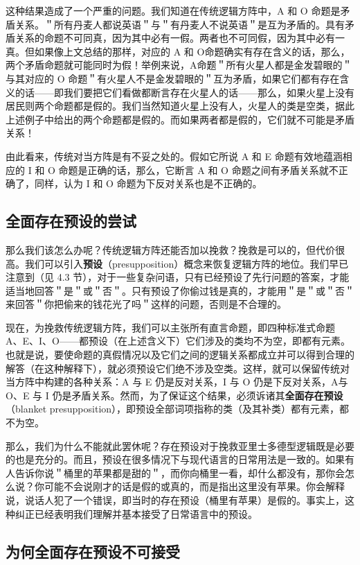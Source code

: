 这种结果造成了一个严重的问题。我们知道在传统逻辑方阵中，A 和 O 命题是矛盾关系。＂所有丹麦人都说英语＂与＂有丹麦人不说英语＂是互为矛盾的。具有矛盾关系的命题不可同真，因为其中必有一假。两者也不可同假，因为其中必有一真。但如果像上文总结的那样，对应的 A 和 O命题确实有存在含义的话，那么，两个矛盾命题就可能同时为假！举例来说，A命题＂所有火星人都是金发碧眼的＂与其对应的 O 命题＂有火星人不是金发碧眼的＂互为矛盾，如果它们都有存在含义的话——即我们要把它们看做都断言存在火星人的话——那么，如果火星上没有居民则两个命题都是假的。我们当然知道火星上没有人，火星人的类是空类，据此上述例子中给出的两个命题都是假的。而如果两者都是假的，它们就不可能是矛盾关系！

由此看来，传统对当方阵是有不妥之处的。假如它所说 A 和 E 命题有效地蕴涵相应的 I 和 O 命题是正确的话，那么，它断言 A 和 O 命题之间有矛盾关系就不正确了，同样，认为 I 和 O 命题为下反对关系也是不正确的。

\subsection{全面存在预设的尝试}

那么我们该怎么办呢？传统逻辑方阵还能否加以挽救？挽救是可以的，但代价很高。我们可以引入\textbf{预设}（presupposition）概念来恢复逻辑方阵的地位。我们早已注意到（见 4.3 节），对于一些复杂问语，只有已经预设了先行问题的答案，才能适当地回答＂是＂或＂否＂。只有预设了你偷过钱是真的，才能用＂是＂或＂否＂来回答＂你把偷来的钱花光了吗＂这样的问题，否则是不合理的。

现在，为挽救传统逻辑方阵，我们可以主张所有直言命题，即四种标准式命题 A、E、I、O——都预设（在上述含义下）它们涉及的类均不为空，即都有元素。也就是说，要使命题的真假情况以及它们之间的逻辑关系都成立并可以得到合理的解答（在这种解释下），就必须预设它们绝不涉及空类。这样，就可以保留传统对当方阵中构建的各种关系：A 与 E 仍是反对关系，I 与 O 仍是下反对关系，A与 O、E 与 I 仍是矛盾关系。然而，为了保证这个结果，必须诉诸其\textbf{全面存在预设}（blanket presupposition），即预设全部词项指称的类（及其补类）都有元素，都不为空。\cite{wiebe1991}

那么，我们为什么不能就此罢休呢？存在预设对于挽救亚里士多德型逻辑既是必要的也是充分的。而且，预设在很多情况下与现代语言的日常用法是一致的。如果有人告诉你说＂桶里的苹果都是甜的＂，而你向桶里一看，却什么都没有，那你会怎么说？你可能不会说刚才的话是假的或真的，而是指出这里没有苹果。你会解释说，说话人犯了一个错误，即当时的存在预设（桶里有苹果）是假的。事实上，这种纠正已经表明我们理解并基本接受了日常语言中的预设。

\subsection{为何全面存在预设不可接受}

